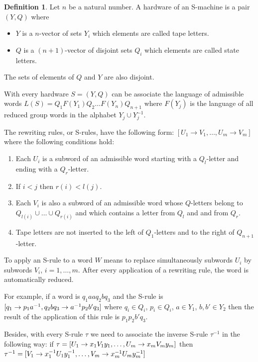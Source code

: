 \documentclass[conference]{IEEEtran}
\theoremstyle{definition}
\newtheorem{defn}{Definition}[section]
\begin{document}
\begin{defn}
Let $n$ be a natural number. 
A hardware of an S-machine is a pair $(Y, Q)$ where 
\begin{itemize}
    \item $Y$ is a $n$-vector of sets $Y_i$ which elements are called tape letters.
    \item $Q$ is a $(n + 1)$-vector of disjoint sets $Q_i$ which elements are called state letters.
\end{itemize}
The sets of elements of $Q$ and $Y$ are also disjoint. 
\end{defn}

With every hardware $S = (Y, Q)$ can be associate the language of admissible words 
$L(S) = Q_1F(Y_1)Q_2 \dots F(Y_n)Q_{n+1}$ where $F(Y_j)$ is the language 
of all reduced group words in the alphabet $Y_j \cup Y_j^{-1}$.

The rewriting rules, or S-rules, have the following form:
$[U_1 \to V_1, \dots ,  U_m \to V_m]$
where the following conditions hold:
\begin{enumerate}
    \item Each $U_i$ is a subword of an admissible word starting with a $Q_l$-letter and ending with a $Q_r$-letter.
    \item If $i < j$ then $r(i) < l(j)$.
    \item Each $V_i$ is also a subword of an admissible word whose $Q$-letters belong to $Q_{l(i)} \cup \dots \cup Q_{r(i)}$ and which contains a letter from $Q_l$ and and from $Q_r$.
    \item Tape letters are not inserted to the left of $Q_1$-letters and to the right of $Q_{n+1}$-letter.
\end{enumerate}

To apply an S-rule to a word $W$ means to replace simultaneously 
subwords $U_i$ by subwords $V_i$, $i = 1, \dots, m$. After every application of 
a rewriting rule, the word is automatically reduced.

For example, if a word is 
$q_1 a a q_2 b q_3$ 
and the S-rule is 
$\newline
[q_1 \to p_1 a^{-1}, q_2 b q_3 \to a^{-1} p_2 b' q_3] $
where $q_i \in Q_i$, $p_i \in Q_i$, $a \in Y_1$, $b, b' \in Y_2$ then the result 
of the application of this rule is
$p_1 p_2 b' q_3$.

Besides, with every S-rule $\tau$ we need to associate the inverse S-rule $\tau^{-1}$ in the following way: if  
$\\ \tau = [U_1 \to x_1 V_1 y_1, \dots, U_m \to x_m V_m y_m]$
then
$\\ \tau^{-1} = [V_1 \to x_1^{-1} U_1 y_1^{-1}, \dots, V_m \to x_m^{-1} U_m y_m^{-1}]$
\end{document}
